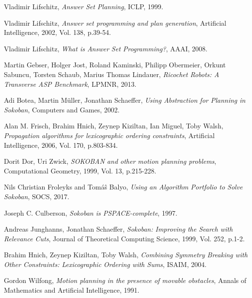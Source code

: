 \documentclass{article}
\begin{document}
\begin{thebibliography}{}
Vladimir Lifschitz,
\textit{Answer Set Planning},
ICLP, 1999.

Vladimir Lifschitz,
\textit{Answer set programming and plan generation},
Artificial Intelligence, 2002, Vol. 138, p.39-54.

Vladimir Lifschitz,
\textit{What is Answer Set Programming?},
AAAI, 2008.

Martin Gebser, Holger Jost, Roland Kaminski, Philipp Obermeier, Orkunt Sabuncu, Torsten Schaub, Marius Thomas Lindauer,
\textit{Ricochet Robots: A Transverse ASP Benchmark},
LPMNR, 2013.

Adi Botea, Martin Müller, Jonathan Schaeffer,
\textit{Using Abstraction for Planning in Sokoban},
Computers and Games, 2002.

Alan M. Frisch, Brahim Hnich, Zeynep Kiziltan, Ian Miguel, Toby Walsh,
\textit{Propagation algorithms for lexicographic ordering constraints},
Artificial Intelligence, 2006, Vol. 170, p.803-834.

Dorit Dor, Uri Zwick,
\textit{SOKOBAN and other motion planning problems},
Computational Geometry, 1999, Vol. 13, p.215-228.

Nils Christian Froleyks and Tom{\'a}{\^s} Balyo,
\textit{Using an Algorithm Portfolio to Solve Sokoban},
SOCS, 2017.

Joseph C. Culberson,
\textit{Sokoban is PSPACE-complete},
1997.

Andreas Junghanns, Jonathan Schaeffer,
\textit{Sokoban: Improving the Search with Relevance Cuts},
Journal of Theoretical Computing Science, 1999, Vol. 252, p.1-2.

Brahim Hnich, Zeynep Kiziltan, Toby Walsh,
\textit{Combining Symmetry Breaking with Other Constraints: Lexicographic Ordering with Sums},
ISAIM, 2004.

Gordon Wilfong,
\textit{Motion planning in the presence of movable obstacles},
Annals of Mathematics and Artificial Intelligence, 1991.
\end{thebibliography}
\end{document}
